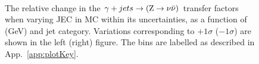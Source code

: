 \begin{figure}[!h]
  \centering
   ~~
  \\

  \caption{\label{fig:tfSyst_jec_gjToZinv} The relative change in the
  $\gamma + jets \rightarrow ({\text Z} \rightarrow \nu\bar{\nu})$ transfer
  factors when varying JEC in MC within its uncertainties, as a function of \scalht (GeV) and jet category. 
  Variations corresponding to $+1\sigma$ ($-1\sigma$) are shown in the left (right) figure. The bins are
    labelled as described in App.~\ref{app:plotKey}.
  }
\end{figure}

